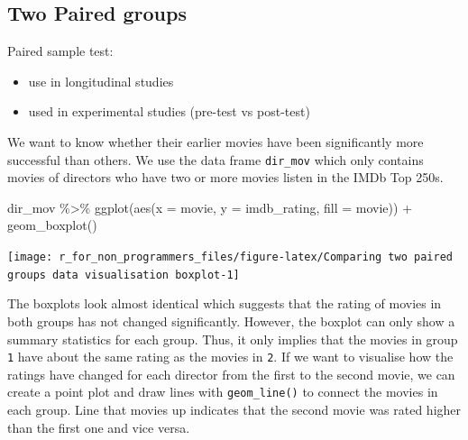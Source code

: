 \documentclass[
]{book}
\newenvironment{Shaded}{\begin{snugshade}}{\end{snugshade}}
\newcommand{\AttributeTok}[1]{\textcolor[rgb]{0.77,0.63,0.00}{#1}}
\newcommand{\DocumentationTok}[1]{\textcolor[rgb]{0.56,0.35,0.01}{\textbf{\textit{#1}}}}
\newcommand{\FunctionTok}[1]{\textcolor[rgb]{0.00,0.00,0.00}{#1}}
\newcommand{\NormalTok}[1]{#1}
\newcommand{\SpecialCharTok}[1]{\textcolor[rgb]{0.00,0.00,0.00}{#1}}
\newcommand{\StringTok}[1]{\textcolor[rgb]{0.31,0.60,0.02}{#1}}
\begin{document}
\begin{Shaded}
\end{Shaded}

\hypertarget{two-paired-groups}{%
\subsection{Two Paired groups}\label{two-paired-groups}}

Paired sample test:

\begin{itemize}
\item
  use in longitudinal studies
\item
  used in experimental studies (pre-test vs post-test)
\end{itemize}

We want to know whether their earlier movies have been significantly more successful than others. We use the data frame \texttt{dir\_mov} which only contains movies of directors who have two or more movies listen in the IMDb Top 250s.

\begin{Shaded}
\begin{Highlighting}[]
\NormalTok{dir\_mov }\SpecialCharTok{\%\textgreater{}\%} 
  \FunctionTok{ggplot}\NormalTok{(}\FunctionTok{aes}\NormalTok{(}\AttributeTok{x =}\NormalTok{ movie, }\AttributeTok{y =}\NormalTok{ imdb\_rating, }\AttributeTok{fill =}\NormalTok{ movie)) }\SpecialCharTok{+}
  \FunctionTok{geom\_boxplot}\NormalTok{()}
\end{Highlighting}
\end{Shaded}

\begin{center}\texttt{[image: r\_for\_non\_programmers\_files/figure-latex/Comparing two paired groups data visualisation boxplot-1]} \end{center}

The boxplots look almost identical which suggests that the rating of movies in both groups has not changed significantly. However, the boxplot can only show a summary statistics for each group. Thus, it only implies that the movies in group \texttt{1} have about the same rating as the movies in \texttt{2}. If we want to visualise how the ratings have changed for each director from the first to the second movie, we can create a point plot and draw lines with \texttt{geom\_line()} to connect the movies in each group. Line that movies up indicates that the second movie was rated higher than the first one and vice versa.
\end{document}
